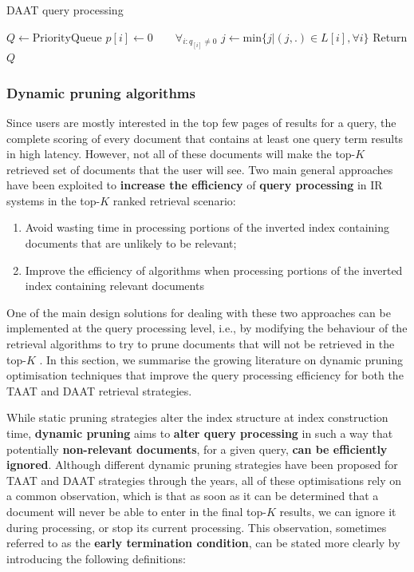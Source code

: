 \begin{algorithm}[]
\caption{DAAT query processing}\label{DAAT}
$Q \gets \text{PriorityQueue}$\;
$p[i] \gets 0 \qquad \forall_{i : q_[i] \neq 0}$\;
$j \gets \text{min} \{ j | (j, .) \in L[i], \forall i \}$\;
Return $Q$\;
\end{algorithm}

\subsubsection{Dynamic pruning algorithms}
Since users are mostly interested in the top few pages of results for a query, the complete scoring of every document that contains at least one query term results in high latency. However, not all of these documents will make the top-$K$ retrieved set of documents that the user will see. Two main general approaches have been exploited to \textbf{increase the efficiency} of \textbf{query processing} in IR systems in the top-$K$ ranked retrieval scenario: 

\begin{enumerate}
    \item Avoid wasting time in processing portions of the inverted index containing documents that are unlikely to be relevant;
    \item Improve the efficiency of algorithms when processing portions of the inverted index containing relevant documents
\end{enumerate}

One of the main design solutions for dealing with these two approaches can be implemented at the query processing level, i.e., by modifying the behaviour of the retrieval algorithms to try to prune documents that will not be retrieved in the top-$K$ . In this section, we summarise the growing literature on dynamic pruning optimisation techniques that improve the query processing efficiency for both the TAAT and DAAT retrieval strategies.

While static pruning strategies alter the index structure at index construction time, \textbf{dynamic pruning} aims to \textbf{alter query processing} in such a way that potentially \textbf{non-relevant documents}, for a given query, \textbf{can be efficiently ignored}. Although different dynamic pruning strategies have been proposed for TAAT and DAAT strategies through the years, all of these optimisations rely on a common observation, which is that as soon as it can be determined that a document will never be able to enter in the final top-$K$ results, we can ignore it during processing, or stop its current processing. This observation, sometimes referred to as the \textbf{early termination condition}, can be stated more clearly by introducing the following definitions:

